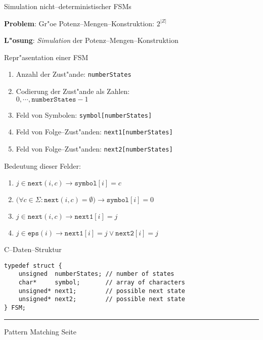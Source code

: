 \begin{slide}{}
\normalsize

\begin{center}
Simulation nicht--deterministischer FSMs
\end{center}
\vspace*{0.5cm}

\footnotesize
\textbf{Problem}: Gr"o\3e  Potenz--Mengen--Konstruktion: $2^{|Z|}$

\textbf{L"osung}: \emph{Simulation} der Potenz--Mengen--Konstruktion

Repr"asentation einer FSM
\begin{enumerate}
\item Anzahl der Zust"ande: \texttt{numberStates}
\item Codierung der Zust"ande als Zahlen: \\[0.3cm]
      \hspace*{1.3cm}  $0, \cdots, \mathtt{numberStates}-1$
\item Feld von Symbolen: \texttt{symbol[numberStates]} 
\item Feld von Folge--Zust"anden: \texttt{next1[numberStates]} 
\item Feld von Folge--Zust"anden: \texttt{next2[numberStates]} 
\end{enumerate}
Bedeutung dieser Felder:
\begin{enumerate}
\item $j \in \texttt{next}(i, c) \rightarrow \mathtt{symbol}[i] = c$
\item $\bigg(\forall c \in \Sigma:  \texttt{next}(i, c) = \emptyset \bigg) \rightarrow \mathtt{symbol}[i] = 0$
\item $j \in \mathtt{next}(i,c) \rightarrow \mathtt{next1}[i] = j$
\item $j \in \mathtt{eps}(i) \rightarrow \mathtt{next1}[i] = j \vee \mathtt{next2}[i] = j$
\end{enumerate}

C--Daten--Struktur
\begin{verbatim}
typedef struct {
    unsigned  numberStates; // number of states
    char*     symbol;       // array of characters
    unsigned* next1;        // possible next state
    unsigned* next2;        // possible next state
} FSM;
\end{verbatim}


\vspace*{\fill}
\tiny \addtocounter{mypage}{1}
\rule{17cm}{1mm}
Pattern Matching \hspace*{\fill} Seite 
\end{slide}


